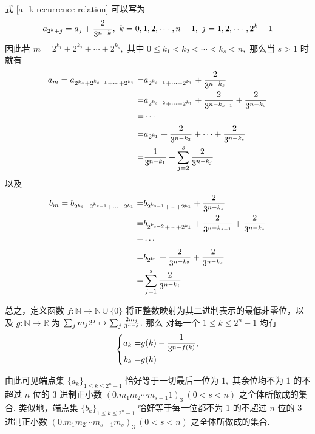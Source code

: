 \documentclass[12pt, a4paper, oneside]{book}
\numberwithin{figure}{section}
\theoremstyle{definition}
\begin{document}
式 \eqref{a_k recurrence relation} 可以写为
\begin{equation}
    a_{2^k+j} = a_{j}+{2\over 3^{n-k}},\ k=0,1,2,\cdots,n-1,\ j=1,2,\cdots,2^k-1
\end{equation}
因此若 $m=2^{k_1}+ 2^{k_2}+\cdots+2^{k_s},$ 其中 $0\leq k_1<k_2<\cdots<k_s<n,$  那么当 $s>1$ 时就有
\begin{equation}
    \begin{aligned}
        a_m = a_{2^{k_s}+2^{k_{s-1}}+\cdots+2^{k_1}}=&a_{2^{k_{s-1}}+\cdots+2^{k_1}}+{2\over 3^{n-k_s}}\\
        =&a_{2^{k_{s-2}}+\cdots+2^{k_1}}+{2\over 3^{n-k_{s-1}}}+{2\over 3^{n-k_s}}\\
        =&\cdots\\
        =&a_{2^{k_1}}+{2\over 3^{n-k_2}}+\cdots+{2\over 3^{n-k_s}}\\
        =&{1\over 3^{n-k_1}}+\sum_{j=2}^s {2\over 3^{n-k_j}}
    \end{aligned}
\end{equation}
以及
\begin{equation}
    \begin{aligned}
        b_m = b_{2^{k_s}+2^{k_{s-1}}+\cdots+2^{k_1}}=&b_{2^{k_{s-1}}+\cdots+2^{k_1}}+{2\over 3^{n-k_s}}\\
        =&b_{2^{k_{s-2}}+\cdots+2^{k_1}}+{2\over 3^{n-k_{s-1}}}+{2\over 3^{n-k_s}}\\
        =&\cdots\\
        =&b_{2^{k_1}}+{2\over 3^{n-k_2}}+{2\over 3^{n-k_s}}\\
        =&\sum_{j=1}^s {2\over 3^{n-k_j}}
    \end{aligned}
\end{equation}

总之，定义函数 $f:\mathbb N\to\mathbb N\cup\{0\}$ 将正整数映射为其二进制表示的最低非零位，以及 $g:\mathbb N\to \mathbb R$ 为 $\sum_j m_j 2^j\mapsto \sum_j {2m_j\over 3^{n-j}},$ 那么
对每一个 $1\leq k\leq 2^n-1$ 均有
\begin{equation}
    \left\{
        \begin{aligned}
            a_k =& g(k)-{1\over 3^{n-f(k)}},\\
            b_k =& g(k)
        \end{aligned}
    \right.
\end{equation}

由此可见端点集 $\{a_k\}_{1\leq k\leq 2^n-1}$ 恰好等于一切最后一位为 $1,$ 其余位均不为 $1$ 的不超过 $n$ 位的 $3$ 进制正小数 $(0.m_1m_2\cdots m_{s-1}1)_3\ (0<s<n)$ 之全体所做成的集合. 类似地，端点集 $\{b_k\}_{1\leq k\leq 2^{n}-1}$ 
恰好等于每一位都不为 $1$ 的不超过 $n$ 位的 $3$ 进制正小数 $(0.m_1m_2\cdots m_{s-1}m_s)_3\ (0<s<n)$ 之全体所做成的集合.
\end{document}
